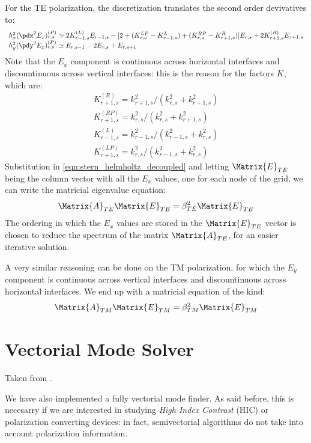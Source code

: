 For the TE polarization, the discretization translates the second
order devivatives to:
$$
\begin{array}{l}
h_x^2 (\pdx^2 E_x)^{(P)}_{r,s} \simeq 2 K^{(L)}_{r-1,s} E_{r-1,s} - [2 +
  (K^{LP}_{r,s} - K^{L}_{r-1,s}) + (K^{RP}_{r,s} - K^{R}_{r+1,s})]
E_{r,s} + 2 K^{(R)}_{r+1,s} E_{r+1,s} \\
h_y^2 (\pdy^2 E_x)^{(P)}_{r,s} \simeq E_{r,s-1} - 2 E_{r,s} + E_{r,s+1}
\end{array}
$$
Note that the $E_x$ component is continuous across horizontal
interfaces and discountinuous across vertical interfaces: this is the
reason for the factors $K$, which are:
$$
\begin{array}{l}
K^{(R)}_{r+1,s}  = k^2_{r+1,s} / (k^2_{r,s} + k^2_{r+1,s}) \\
K^{(RP)}_{r+1,s} = k^2_{r,s}   / (k^2_{r,s} + k^2_{r+1,s}) \\
K^{(L)}_{r-1,s}  = k^2_{r-1,s} / (k^2_{r-1,s} + k^2_{r,s}) \\
K^{(LP)}_{r+1,s} = k^2_{r,s}   / (k^2_{r-1,s} + k^2_{r,s})
\end{array}
$$
Substitution in \ref{eqn:stern_helmholtz_decoupled} and letting
$\Matrix{E}_{TE}$ being the column vector with all the $E_x$ values, one
for each node of the grid, we can write the matricial eigenvalue
equation:
$$
\Matrix{A}_{TE} \Matrix{E}_{TE} = \beta^2_{TE} \Matrix{E}_{TE}
$$
The ordering in which the $E_x$ values are stored in the
$\Matrix{E}_{TE}$ vector is chosen to reduce the spectrum of the
matrix $\Matrix{A}_{TE}$, for an easier iterative solution.

A very similar reasoning can be done on the TM polarization, for which
the $E_y$ component is continuous across vertical interfaces and
discountinuous across horizontal interfaces. We end up with a
matricial equation of the kind:
$$
\Matrix{A}_{TM} \Matrix{E}_{TM} = \beta^2_{TM} \Matrix{E}_{TM}
$$

\section{Vectorial Mode Solver} \label{sec:vectorial_mode_solver}

Taken from \cite{lusse_analysis}.

We have also implemented a fully vectorial mode finder. As said
before, this is necesarry if we are interested in studying \emph{High
  Index Contrast} (HIC) or polarization converting devices: in fact,
semivectorial algorithms do not take into account polarization
information.

